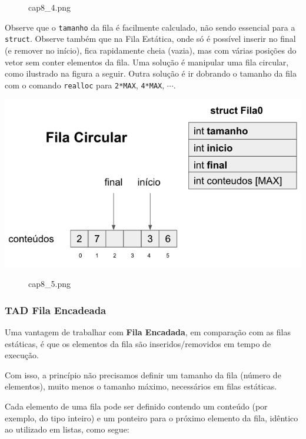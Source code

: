 \documentclass[12pt,a4paper]{article}
\begin{document}
    \begin{figure}
\centering
\caption{cap8\_4.png}
\end{figure}

    Observe que o \texttt{tamanho} da fila é facilmente calculado, não sendo
essencial para a \texttt{struct}. Observe também que na Fila Estática,
onde só é possível inserir no final (e remover no início), fica
rapidamente cheia (vazia), mas com várias posições do vetor sem conter
elementos da fila. Uma solução é manipular uma fila circular, como
ilustrado na figura a seguir. Outra solução é ir dobrando o tamanho da
fila com o comando \texttt{realloc} para \texttt{2*MAX}, \texttt{4*MAX},
\(\cdots\).

\includegraphics{"figs/cap8_5.png"}

    \begin{figure}
\centering
\caption{cap8\_5.png}
\end{figure}

    \hypertarget{tad-fila-encadeada}{%
\subsubsection{TAD Fila Encadeada}\label{tad-fila-encadeada}}

    Uma vantagem de trabalhar com \textbf{Fila Encadada}, em comparação com
as filas estáticas, é que os elementos da fila são inseridos/removidos
em tempo de execução.

Com isso, a princípio não precisamos definir um tamanho da fila (número
de elementos), muito menos o tamanho máximo, necessários em filas
estáticas.

Cada elemento de uma fila pode ser definido contendo um conteúdo (por
exemplo, do tipo inteiro) e um ponteiro para o próximo elemento da fila,
idêntico ao utilizado em listas, como segue:
\end{document}
